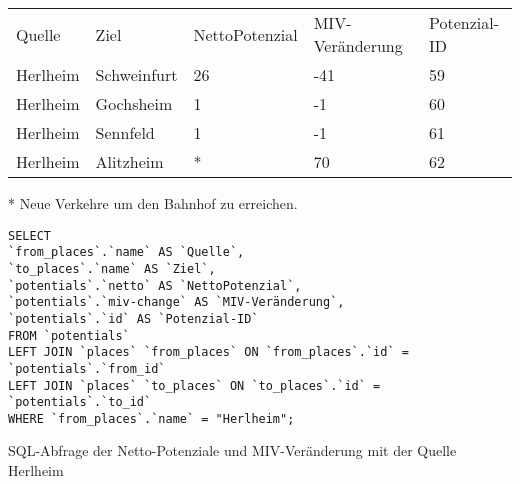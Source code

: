 \begin{tabularx}{\textwidth}{*5{X}}
Quelle & Ziel & NettoPotenzial & MIV-Veränderung & Potenzial-ID\\ 
Herlheim & Schweinfurt & 26 & -41 & 59\\ 
Herlheim & Gochsheim & 1 & -1 & 60\\ 
Herlheim & Sennfeld & 1 & -1 & 61\\ 
Herlheim & Alitzheim & * & 70 & 62\\ 
\end{tabularx}    
\newline
\newline
* Neue Verkehre um den Bahnhof zu erreichen.
\newline
\begin{listing}[htbp]
\begin{verbatim}
SELECT
`from_places`.`name` AS `Quelle`, 
`to_places`.`name` AS `Ziel`, 
`potentials`.`netto` AS `NettoPotenzial`, 
`potentials`.`miv-change` AS `MIV-Veränderung`, 
`potentials`.`id` AS `Potenzial-ID`
FROM `potentials`
LEFT JOIN `places` `from_places` ON `from_places`.`id` = `potentials`.`from_id`
LEFT JOIN `places` `to_places` ON `to_places`.`id` = `potentials`.`to_id`
WHERE `from_places`.`name` = "Herlheim";
\end{verbatim}
\caption{SQL-Abfrage der Netto-Potenziale und MIV-Veränderung mit der Quelle Herlheim}\label{lst-fz-herlheim}
\end{listing}